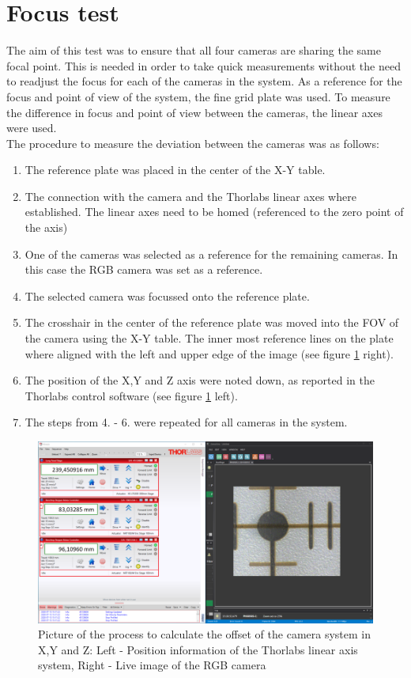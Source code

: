 \section{Focus test}
The aim of this test was to ensure that all four cameras are sharing the same focal point. This is needed in order to take quick measurements without the need to readjust the focus for each of the cameras in the system. As a reference for the focus and point of view of the system, the fine grid plate was used. To measure the difference in focus and point of view between the cameras, the linear axes were used.\\
The procedure to measure the deviation between the cameras was as follows:
\begin{enumerate}
	\item The reference plate was placed in the center of the X-Y table.
	\item The connection with the camera and the Thorlabs linear axes where established. The linear axes need to be homed (referenced to the zero point of the axis)
	\item One of the cameras was selected as a reference for the remaining cameras. In this case the RGB camera was set as a reference. 
	\item The selected camera was focussed onto the reference plate.
	\item The crosshair in the center of the reference plate was moved into the FOV of the camera using the X-Y table. The inner most reference lines on the plate where aligned with the left and upper edge of the image (see figure \ref{XYZCalibSetup} right).
	\item The position of the X,Y and Z axis were noted down, as reported in the Thorlabs control software (see figure \ref{XYZCalibSetup} left). 
	\item The steps from 4. - 6. were repeated for all cameras in the system.
\end{enumerate}

\begin{figure}
\begin{center}
\includegraphics[width=12cm]{Pictures/XYZCalibSetup}
\caption[Picture of the process to calculate the offset of the camera system in X,Y and Z]{Picture of the process to calculate the offset of the camera system in X,Y and Z: Left - Position information of the Thorlabs linear axis system, Right - Live image of the RGB camera}
\label{XYZCalibSetup}
\end{center}
\end{figure}



